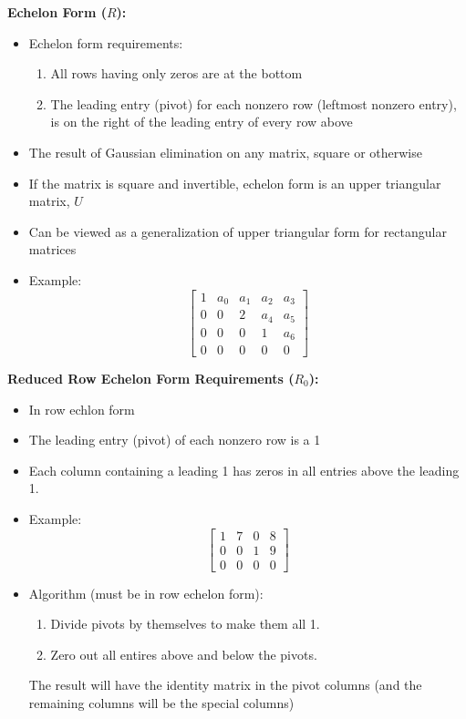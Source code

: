 \documentclass[11pt]{article}
\begin{document}
\textbf{Echelon Form ($R$):}
\begin{itemize}
    \item Echelon form requirements:
    \begin{enumerate}
        \item All rows having only zeros are at the bottom
        \item The leading entry (pivot) for each nonzero row (leftmost nonzero entry), is on 
        the right of the leading entry of every row above
    \end{enumerate}
    \item The result of Gaussian elimination on any matrix, square or otherwise
    \item If the matrix is square and invertible, echelon form is an upper triangular matrix, 
    $U$
    \item Can be viewed as a generalization of upper triangular form for rectangular matrices 
    \item Example: \[
        \begin{bmatrix}
        1 & a_0 & a_1 & a_2 & a_3 \\
        0 & 0 & 2 & a_4 & a_5 \\
        0 & 0 & 0 & 1 & a_6 \\
        0 & 0 & 0 & 0 & 0 
        \end{bmatrix}
        \]
\end{itemize}

\textbf{Reduced Row Echelon Form Requirements ($R_0$):}
\begin{itemize}
    \item In row echlon form 
    \item The leading entry (pivot) of each nonzero row is a 1
    \item Each column containing a leading 1 has zeros in all entries above the leading 1. 
    \item Example: \[
        \begin{bmatrix}
            1 & 7 & 0 & 8 \\
            0 & 0 & 1 & 9 \\
            0 & 0 & 0 & 0
        \end{bmatrix}
    \]
    \item Algorithm (must be in row echelon form):
    \begin{enumerate}
        \item Divide pivots by themselves to make them all 1.
        \item Zero out all entires above and below the pivots.
    \end{enumerate}
    The result will have the identity matrix in the pivot columns (and the remaining columns 
    will be the special columns)
\end{itemize}
\end{document}
